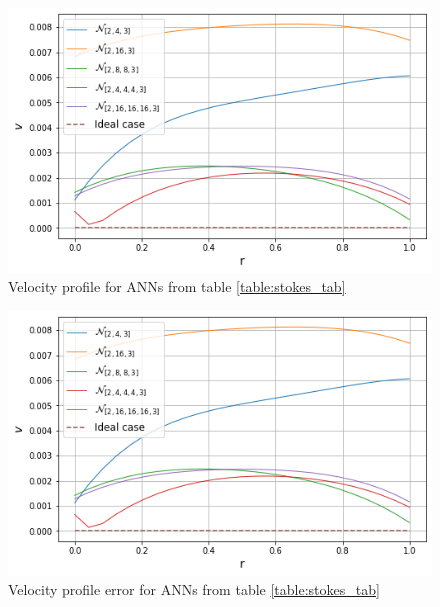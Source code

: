 \begin{figure}
	\centering
	\includegraphics[width=\textwidth]{images/chapter3/stokes_simple_nets_profile.png}
	\caption{Velocity profile for ANNs from table \ref{table:stokes_tab}}
	\label{fig:stokes_simple_nets_profile}\tabularnewline
\end{figure}

\begin{figure}
	\centering
	\includegraphics[width=\textwidth]{images/chapter3/stokes_simple_nets_profile_error.png}
	\caption{Velocity profile error for ANNs from table \ref{table:stokes_tab}}
	\label{fig:stokes_simple_nets_profile_error}\tabularnewline
\end{figure}

